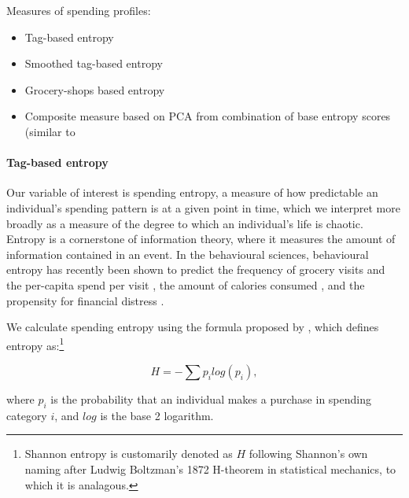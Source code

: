 Measures of spending profiles:
\begin{itemize}
    \item Tag-based entropy

    \item Smoothed tag-based entropy

    \item Grocery-shops based entropy

    \item Composite measure based on PCA from combination of base entropy
        scores (similar to \citet{eagle2010network}
\end{itemize}


\paragraph{Tag-based entropy}%
\label{par:tag_based_entropy}

Our variable of interest is spending entropy, a measure of how predictable an
individual's spending pattern is at a given point in time, which we interpret
more broadly as a measure of the degree to which an individual's life is
chaotic. Entropy is a cornerstone of information theory, where it measures the
amount of information contained in an event. In the behavioural sciences,
behavioural entropy has recently been shown to predict the frequency of grocery
visits and the per-capita spend per visit \citep{guidotti2015behavioral}, the
amount of calories consumed \citep{skatova2019those}, and the propensity for
financial distress \citep{muggleton2020evidence}.

We calculate spending entropy using the formula proposed by
\citet{shannon1948mathematical}, which defines entropy as:\footnote{Shannon
    entropy is customarily denoted as $H$ following Shannon's own naming after
    Ludwig Boltzman's 1872 H-theorem in statistical mechanics, to which it is
analagous.}

\begin{equation}
\label{equ:entropy}
    H = -\sum{p_i}log(p_i),
\end{equation}

where $p_i$ is the probability that an individual makes a purchase in spending
category $i$, and $log$ is the base 2 logarithm.


